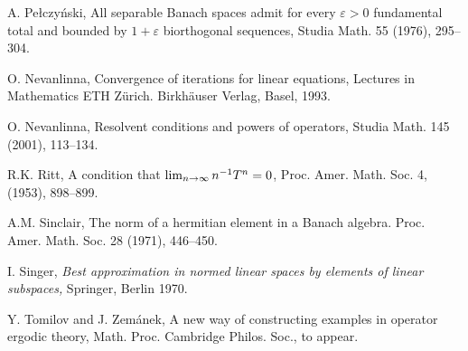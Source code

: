 \documentclass[12pt]{amsart}
\begin{document}
\begin{thebibliography}{999}
 A. Pe\l czy\'nski, All separable Banach spaces admit for every
$\varepsilon >0$
   fundamental total and bounded by $1+\varepsilon $ biorthogonal sequences,
Studia Math. 55 (1976),
    295--304.



O. Nevanlinna, Convergence of iterations for linear equations,
Lectures in Mathematics ETH Z\"urich. Birkh\"auser Verlag, Basel, 1993.

O. Nevanlinna, Resolvent conditions and powers of operators,
Studia Math.  145  (2001), 113--134.

R.K. Ritt,  A condition that $\lim\sb {n\to\infty}n\sp {-1}T\sp
n=0$, Proc. Amer. Math. Soc.  4,  (1953), 898--899.

A.M. Sinclair,  The norm of a hermitian element in a Banach
algebra. Proc. Amer. Math. Soc.  28  (1971), 446--450.

 I. Singer, {\it Best approximation in normed linear
spaces by elements of linear subspaces,} Springer, Berlin 1970.

Y. Tomilov and J. Zem\'anek, A new way of constructing
examples in operator ergodic theory,  Math. Proc.
Cambridge Philos. Soc., to appear.

\end{thebibliography}
\end{document}
